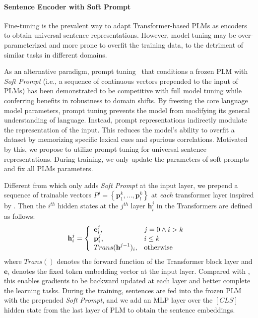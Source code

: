 \documentclass[11pt]{article}
\begin{document}
\paragraph{Sentence Encoder with Soft Prompt}
Fine-tuning is the prevalent way to adapt Transformer-based PLMs as encoders to obtain universal sentence representations. However, model tuning may be over-parameterized and more prone to overfit the training data, to the detriment of similar tasks in different domains.

As an alternative paradigm, prompt tuning~\cite{Lester21sacle, li2021prefix} that conditions a frozen PLM with \textit{Soft Prompt} (i.e., a sequence of continuous vectors prepended to the input of PLMs) has been demonstrated to be competitive with full model tuning while conferring benefits in robustness to domain shifts. By freezing the core language model parameters, prompt tuning prevents the model from modifying its general understanding of language. Instead, prompt representations indirectly modulate the representation of the input. This reduces the model’s ability to overfit a dataset by memorizing specific lexical cues and spurious correlations. Motivated by this, we propose to utilize prompt tuning for universal sentence representations.
During training, we only update the parameters of soft prompts and fix all PLMs parameters. 

Different from \cite{Lester21sacle} which only adds \textit{Soft Prompt} at the input layer, we prepend a sequence of trainable vectors $P^j=\left\{\textbf{p}_{1}^k, ..., \textbf{p}_{l}^k\right\}$ at \emph{each} transformer layer inspired by \cite{liu2021ptuningv2}. Then the $i^{th}$ hidden states at the $j^{th}$ layer $\textbf{h}_{i}^j$ in the Transformers \cite{vaswani2017transformer} are defined as follows:
\begin{equation}
\textbf{h}_{i}^j=\left\{
\begin{array}{ll}
\textbf{e}_{i}^j,& \text{$ j = 0 \wedge i > k $ } \\
\textbf{p}_{i}^j,& \text{$ i \leq k $ } \\
Trans(\textbf{h}^{j-1})_{i},& \text{otherwise}
\end{array}
\right.
\end{equation}
where $Trans()$ denotes the forward function of the Transformer block layer and $\textbf{e}_{i}$ denotes the fixed token embedding vector at the input layer. Compared with \cite{Lester21sacle}, this enables gradients to be backward updated at each layer and better complete the learning tasks. 
During the training, sentences are fed into the frozen PLM with the prepended \textit{Soft Prompt}, and we add an MLP layer over the $[CLS]$ hidden state from the last layer of PLM to obtain the sentence embeddings. 
\end{document}
